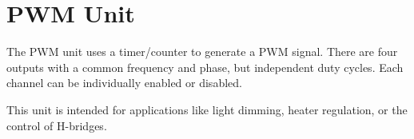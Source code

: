 \section{PWM Unit}

The PWM unit uses a timer/counter to generate a PWM signal. There are four outputs with a common frequency and phase, but independent duty cycles. Each channel can be individually enabled or disabled.

This unit is intended for applications like light dimming, heater regulation, or the control of H-bridges.

